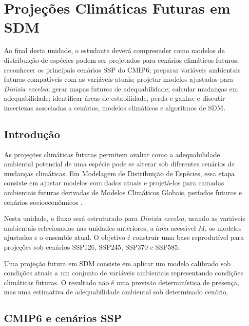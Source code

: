 \chapter[Projeções climáticas futuras]{Projeções Climáticas Futuras em SDM}

\begin{objetivos}
	Ao final desta unidade, o estudante deverá compreender como modelos de distribuição de espécies podem ser projetados para cenários climáticos futuros; reconhecer os principais cenários SSP do CMIP6; preparar variáveis ambientais futuras compatíveis com as variáveis atuais; projetar modelos ajustados para \textit{Dinizia excelsa}; gerar mapas futuros de adequabilidade; calcular mudanças em adequabilidade; identificar áreas de estabilidade, perda e ganho; e discutir incertezas associadas a cenários, modelos climáticos e algoritmos de SDM.
\end{objetivos}

\section{Introdução}

As projeções climáticas futuras permitem avaliar como a adequabilidade ambiental potencial de uma espécie pode se alterar sob diferentes cenários de mudanças climáticas. Em Modelagem de Distribuição de Espécies, essa etapa consiste em ajustar modelos com dados atuais e projetá-los para camadas ambientais futuras derivadas de Modelos Climáticos Globais, períodos futuros e cenários socioeconômicos \parencite{guisan2017habitat,ipcc2021,araujo2006climate,thuiller2005climate}.

Nesta unidade, o fluxo será estruturado para \textit{Dinizia excelsa}, usando as variáveis ambientais selecionadas nas unidades anteriores, a área acessível \(M\), os modelos ajustados e o ensemble atual. O objetivo é construir uma base reprodutível para projeções sob cenários SSP126, SSP245, SSP370 e SSP585.

\begin{conceito}[title={\faBook\quad Projeção climática futura}]
	Uma projeção futura em SDM consiste em aplicar um modelo calibrado sob condições atuais a um conjunto de variáveis ambientais representando condições climáticas futuras. O resultado não é uma previsão determinística de presença, mas uma estimativa de adequabilidade ambiental sob determinado cenário.
\end{conceito}

\section{CMIP6 e cenários SSP}

